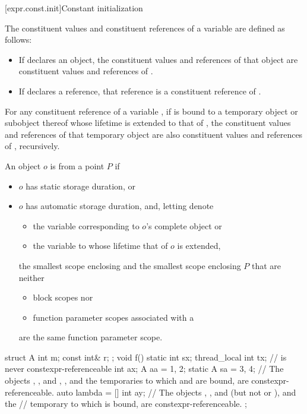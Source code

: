 [expr.const.init]{Constant initialization}

\pnum
The constituent values and constituent references of
a variable  are defined as follows:
\begin{itemize}
\item
If  declares an object,
the constituent values and references of that object are
constituent values and references of .
\item
If  declares a reference,
that reference is a constituent reference of .
\end{itemize}
For any constituent reference  of a variable ,
if  is bound to a temporary object or subobject thereof
whose lifetime is extended to that of ,
the constituent values and references of that temporary object
are also constituent values and references of , recursively.

\pnum
An object $o$ is  from a point $P$ if
\begin{itemize}
\item
$o$ has static storage duration, or
\item
$o$ has automatic storage duration, and, letting  denote
\begin{itemize}
\item
the variable corresponding to $o$'s complete object or
\item
the variable to whose lifetime that of $o$ is extended,
\end{itemize}
the smallest scope enclosing  and the smallest scope enclosing $P$
that are neither
\begin{itemize}
\item
block scopes nor
\item
function parameter scopes associated with
a 
\end{itemize}
are the same function parameter scope.
\end{itemize}
\begin{example}
\begin{codeblock}
struct A {
  int m;
  const int& r;
};
void f() {
  static int sx;
  thread_local int tx;                  //  is never constexpr-referenceable
  int ax;
  A aa = {1, 2};
  static A sa = {3, 4};
  // The objects , , and , , and the temporaries to which  and  are bound, are constexpr-referenceable.
  auto lambda = [] {
    int ay;
    // The objects , , and  (but not  or ), and the
    // temporary to which  is bound, are constexpr-referenceable.
  };
}
\end{codeblock}
\end{example}

